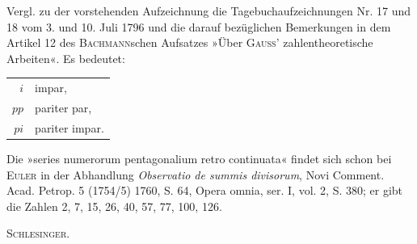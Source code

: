 Vergl. zu der vorstehenden Aufzeichnung die Tagebuchaufzeichnungen Nr. 17 und 18 vom 3. und
10. Juli 1796 und die darauf bezüglichen Bemerkungen in dem Artikel 12 des \textsc{Bachmann}schen Aufsatzes
»Über \textsc{Gauss}' zahlentheoretische Arbeiten«. Es bedeutet:
\begin{center}\begin{tabular}{rl}
$i$&impar,\\
$pp$&pariter par,\\
$pi$&pariter impar.
\end{tabular}\end{center}
\par\indent Die »series numerorum pentagonalium retro continuata« findet sich schon bei \textsc{Euler} in der Abhandlung \textit{Observatio de summis divisorum}, Novi Comment. Acad. Petrop. 5 (1754/5) 1760, S. 64, Opera omnia,
ser. I, vol. 2, S. 380; er gibt die Zahlen 2, 7, 15, 26, 40, 57, 77, 100, 126.
\begin{flushright}\textsc{Schlesinger.}\end{flushright}
\ClosingRule\clearpage\endgroup
